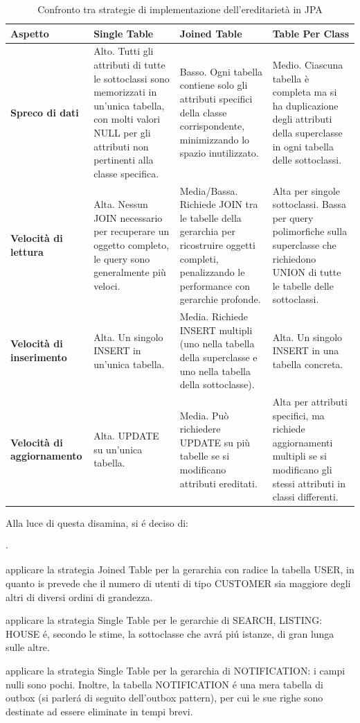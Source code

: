 \begin{table}[h]
    \centering
    \begin{tabularx}{\textwidth}{|X|X|X|X|}
    \hline
    \textbf{Aspetto} & \textbf{Single Table} & \textbf{Joined Table} & \textbf{Table Per Class} \\
    \hline
    \textbf{Spreco di dati} & 
    Alto. Tutti gli attributi di tutte le sottoclassi sono memorizzati in un'unica tabella, con molti valori NULL per gli attributi non pertinenti alla classe specifica. & 
    Basso. Ogni tabella contiene solo gli attributi specifici della classe corrispondente, minimizzando lo spazio inutilizzato. & 
    Medio. Ciascuna tabella è completa ma si ha duplicazione degli attributi della superclasse in ogni tabella delle sottoclassi. \\
    \hline
    \textbf{Velocità di lettura} & 
    Alta. Nessun JOIN necessario per recuperare un oggetto completo, le query sono generalmente più veloci. & 
    Media/Bassa. Richiede JOIN tra le tabelle della gerarchia per ricostruire oggetti completi, penalizzando le performance con gerarchie profonde. & 
    Alta per singole sottoclassi. Bassa per query polimorfiche sulla superclasse che richiedono UNION di tutte le tabelle delle sottoclassi. \\
    \hline
    \textbf{Velocità di inserimento} & 
    Alta. Un singolo INSERT in un'unica tabella. & 
    Media. Richiede INSERT multipli (uno nella tabella della superclasse e uno nella tabella della sottoclasse). & 
    Alta. Un singolo INSERT in una tabella concreta. \\
    \hline
    \textbf{Velocità di aggiornamento} & 
    Alta. UPDATE su un'unica tabella. & 
    Media. Può richiedere UPDATE su più tabelle se si modificano attributi ereditati. & 
    Alta per attributi specifici, ma richiede aggiornamenti multipli se si modificano gli stessi attributi in classi differenti. \\
    \hline
    \end{tabularx}
    \caption{Confronto tra strategie di implementazione dell'ereditarietà in JPA}
    \label{tab:inheritance-comparison}
    \end{table}

Alla luce di questa disamina, si é deciso di:
\begin{list}{$\cdot$}{}
    \item applicare la strategia Joined Table per la gerarchia con radice la tabella USER, in quanto
    is prevede che il numero di utenti di tipo CUSTOMER sia maggiore 
    degli altri di diversi ordini di grandezza.
    \item applicare la strategia Single Table per le gerarchie di SEARCH,
    LISTING: HOUSE é, secondo le stime, la sottoclasse che
    avrá piú istanze, di gran lunga sulle altre.
    \item applicare la strategia Single Table per la gerarchia di NOTIFICATION:
    i campi nulli sono pochi. Inoltre, la tabella NOTIFICATION é una mera tabella
    di outbox (si parlerá di seguito dell'outbox pattern), per cui le sue righe sono
    destinate ad essere eliminate in tempi brevi.
\end{list}

